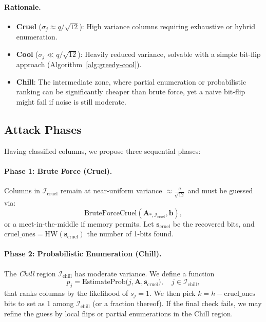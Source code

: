 \documentclass[conference]{IEEEtran}
\begin{document}
\paragraph{Rationale.}
\begin{itemize}
  \item \textbf{Cruel} ($\sigma_j \approx q/\sqrt{12}$): High variance columns requiring exhaustive or hybrid enumeration.
  \item \textbf{Cool} ($\sigma_j \ll q/\sqrt{12}$): Heavily reduced variance, solvable with a simple bit-flip approach (Algorithm~\ref{alg:greedy-cool}).
  \item \textbf{Chill}: The intermediate zone, where partial enumeration or probabilistic ranking can be significantly cheaper than brute force, yet a naive bit-flip might fail if noise is still moderate.
\end{itemize}


\subsection{Attack Phases}
\label{subsec:attack-phases}

Having classified columns, we propose three sequential phases:

\paragraph{Phase 1: Brute Force (Cruel).}
Columns in $\mathcal{I}_{\mathrm{cruel}}$ remain at near-uniform variance $\approx \frac{q}{\sqrt{12}}$ and must be guessed via:
\[
  \mathrm{BruteForceCruel}(\mathbf{A}_{*, \mathcal{I}_{\mathrm{cruel}}}, \mathbf{b}), 
\]
or a meet-in-the-middle if memory permits. Let $\mathbf{s}_{\mathrm{cruel}}$ be the recovered bits, and $\mathrm{cruel\_ones} = \mathrm{HW}(\mathbf{s}_{\mathrm{cruel}})$ the number of 1-bits found.

\paragraph{Phase 2: Probabilistic Enumeration (Chill).}
The \emph{Chill} region $\mathcal{I}_{\mathrm{chill}}$ has moderate variance. We define a function 
\[
  p_j = \mathrm{EstimateProb}\bigl(j,\mathbf{A},\mathbf{s}_{\mathrm{cruel}}\bigr), \quad
  j \in \mathcal{I}_{\mathrm{chill}},
\]
that ranks columns by the likelihood of $s_j=1$. We then pick $k = h - \mathrm{cruel\_ones}$ bits to set as 1 among $\mathcal{I}_{\mathrm{chill}}$ (or a fraction thereof). If the final check fails, we may refine the guess by local flips or partial enumerations in the Chill region.
\end{document}

